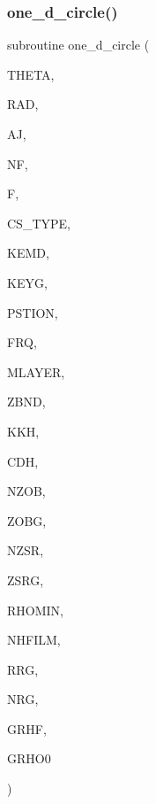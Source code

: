 \subsubsection{\texorpdfstring{one\+\_\+d\+\_\+circle()}{one\_d\_circle()}}
{\footnotesize\ttfamily subroutine one\+\_\+d\+\_\+circle (\begin{DoxyParamCaption}\item[{real, intent(in)}]{T\+H\+E\+TA,  }\item[{real, intent(in)}]{R\+AD,  }\item[{real, intent(in)}]{AJ,  }\item[{integer, intent(out)}]{NF,  }\item[{complex, dimension(6), intent(out)}]{F,  }\item[{integer, intent(in)}]{C\+S\+\_\+\+T\+Y\+PE,  }\item[{integer, intent(in)}]{K\+E\+MD,  }\item[{integer, intent(in)}]{K\+E\+YG,  }\item[{real, dimension(8), intent(in)}]{P\+S\+T\+I\+ON,  }\item[{real, intent(in)}]{F\+RQ,  }\item[{integer, intent(in)}]{M\+L\+A\+Y\+ER,  }\item[{real, dimension(0\+:mlayer), intent(in)}]{Z\+B\+ND,  }\item[{complex, dimension(0\+:mlayer), intent(in)}]{K\+KH,  }\item[{complex, dimension(0\+:mlayer), intent(in)}]{C\+DH,  }\item[{integer, intent(in)}]{N\+Z\+OB,  }\item[{real, dimension(nzob), intent(in)}]{Z\+O\+BG,  }\item[{integer, intent(in)}]{N\+Z\+SR,  }\item[{real, dimension(2,nzsr), intent(in)}]{Z\+S\+RG,  }\item[{real, intent(in)}]{R\+H\+O\+M\+IN,  }\item[{integer, intent(in)}]{N\+H\+F\+I\+LM,  }\item[{real, dimension(nrg), intent(in)}]{R\+RG,  }\item[{integer, intent(in)}]{N\+RG,  }\item[{complex, dimension(11,nhfilm,nzsr,nzob), intent(in)}]{G\+R\+HF,  }\item[{complex, dimension(4,nzsr,nzob), intent(in)}]{G\+R\+H\+O0 }\end{DoxyParamCaption})}


